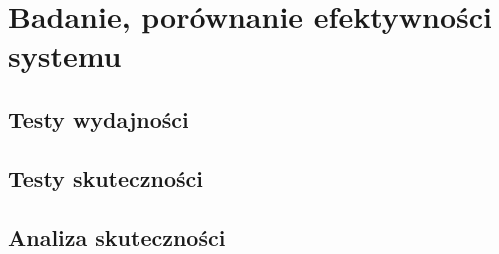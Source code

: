 \chapter{Badanie, porównanie efektywności systemu}
\section{Testy wydajności}
\section{Testy skuteczności}
\section{Analiza skuteczności}